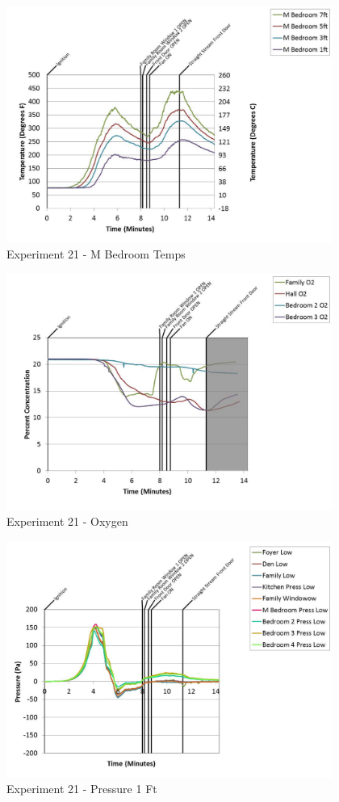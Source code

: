 \documentclass{article}
\begin{document}
\begin{appendices}
	\clearpage

	\begin{figure}[h!]
		\centering
		\includegraphics[height=3.05in]{0_Images/Results_Charts/Exp_21_Charts/MBedroomTemps.pdf}
		\caption{Experiment 21 - M Bedroom Temps}
	\end{figure}
 

	\begin{figure}[h!]
		\centering
		\includegraphics[height=3.05in]{0_Images/Results_Charts/Exp_21_Charts/Oxygen.pdf}
		\caption{Experiment 21 - Oxygen}
	\end{figure}
 
	\clearpage

	\begin{figure}[h!]
		\centering
		\includegraphics[height=3.05in]{0_Images/Results_Charts/Exp_21_Charts/Pressure1Ft.pdf}
		\caption{Experiment 21 - Pressure 1 Ft}
	\end{figure}
 


\end{appendices}
\end{document}
